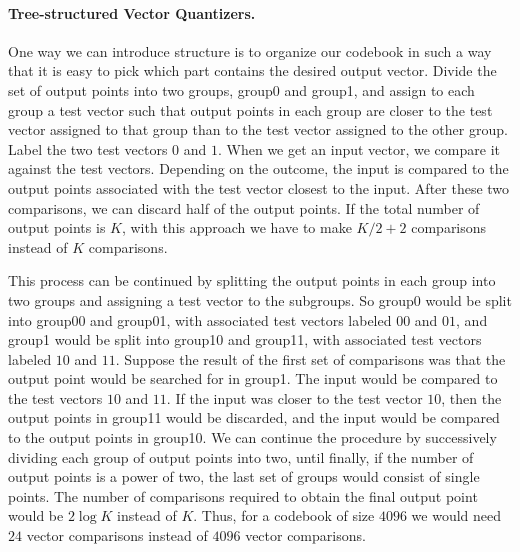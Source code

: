 \paragraph{Tree-structured Vector Quantizers.} One way we can introduce structure is to organize our codebook in such a way that it is easy to pick which part contains the desired output vector. Divide the set of output points into two groups, group0 and group1, and assign to each group a test vector such that output points in each group are closer to the test vector assigned to that group than to the test vector assigned to the other group. Label the two test vectors $0$ and $1$. When we get an input vector, we compare it against the test vectors. Depending on the outcome, the input is compared to the output points associated with the test vector closest to the input. After these two comparisons, we can discard half of the output points. If the total number of output points is $K$, with this approach we have to make $K/2 + 2$ comparisons instead of $K$ comparisons.

This process can be continued by splitting the output points in each group into two groups and assigning a test vector to the subgroups. So group0 would be split into group00 and group01, with associated test vectors labeled $00$ and $01$, and group1 would be split into group10 and group11, with associated test vectors labeled $10$ and $11$. Suppose the result of the first set of comparisons was that the output point would be searched for in group1. The input would be compared to the test vectors $10$ and $11$. If the input was closer to the test vector $10$, then the output points in group11 would be discarded, and the input would be compared to the output points in group10. We can continue the procedure by successively dividing each group of output points into two, until finally, if the number of output points is a power of two, the last set of groups would consist of single points. The number of comparisons required to obtain the final output point would be $2 \log K$ instead of $K$. Thus, for a codebook of size $4096$ we would need $24$ vector comparisons instead of $4096$ vector comparisons.



